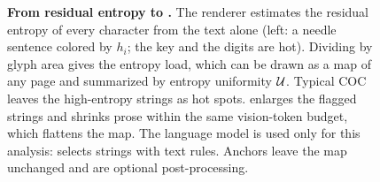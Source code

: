 \begin{figure}[ht!]
  \caption{\textbf{From residual entropy to \name.} The renderer estimates the residual entropy of every character from the text alone (left: a needle sentence colored by $h_i$; the key and the digits are hot). Dividing by glyph area gives the entropy load, which can be drawn as a map of any page and summarized by entropy uniformity $\mathcal{U}$. Typical COC leaves the high-entropy strings as hot spots. \name enlarges the flagged strings and shrinks prose within the same vision-token budget, which flattens the map. The language model is used only for this analysis: \name selects strings with text rules. Anchors leave the map unchanged and are optional post-processing.}
  \label{fig:method}
  \end{figure}
  